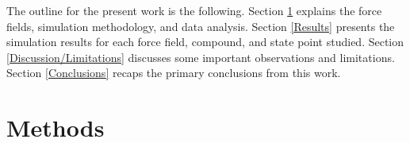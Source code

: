 \documentclass[preprint,review,12pt]{elsarticle}
\begin{document}
    
    The outline for the present work is the following. Section \ref{Methods} explains the force fields, simulation methodology, and data analysis. Section \ref{Results} presents the simulation results for each force field, compound, and state point studied. Section \ref{Discussion/Limitations} discusses some important observations and limitations. Section \ref{Conclusions} recaps the primary conclusions from this work.
    
	
	
	\section{Methods} \label{Methods}
	
\end{document}
